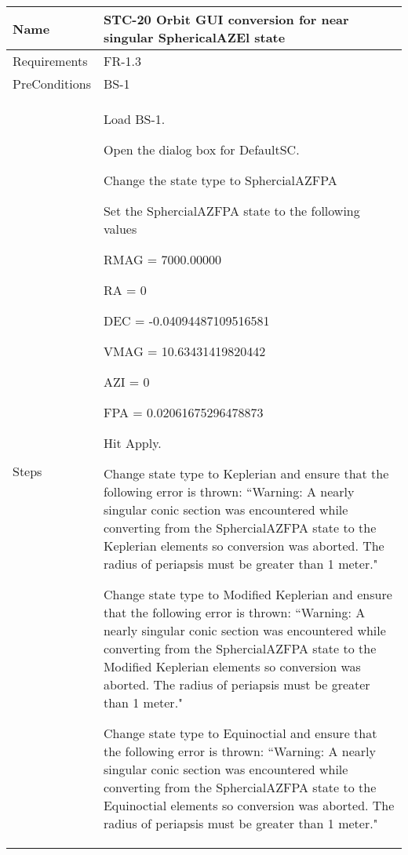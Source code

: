 \begin{table}[htbp!]
\centering
      \begin{tabular}{|p{1.05 in} |p{4.75 in} |}
      \hline
         \rowcolor[rgb]{0.8,0.8,0.8} Name & STC-20 Orbit GUI conversion for near singular SphericalAZEl state \\
         \hline
         Requirements & FR-1.3\\  \hline
         PreConditions & BS-1\\     \hline
        Steps &
         \begin{compactenum}
             \item Load BS-1.
             \item Open the dialog box for DefaultSC.
             \item Change the state type to SphercialAZFPA
             \item Set the SphercialAZFPA state to the following values
                 \begin{compactenum}
                    \item RMAG  = 7000.00000
                    \item RA = 0
                    \item DEC = -0.04094487109516581
                    \item VMAG = 10.63431419820442
                    \item AZI = 0
                    \item FPA = 0.02061675296478873
                    \end{compactenum}
             \item Hit Apply.
             \item Change state type to Keplerian and ensure that the following error is thrown: ``Warning: A nearly singular conic section was encountered while converting from the SphercialAZFPA state to the Keplerian elements so conversion was aborted.  The radius of periapsis must be greater than 1 meter."
             \item Change state type to Modified Keplerian and ensure that the following error is thrown: ``Warning: A nearly singular conic section was encountered while converting from the SphercialAZFPA state to the Modified Keplerian elements so conversion was aborted.  The radius of periapsis must be greater than 1 meter."
             \item Change state type to Equinoctial and ensure that the following error is thrown:  ``Warning: A nearly singular conic section was encountered while converting from the SphercialAZFPA state to the Equinoctial elements so conversion was aborted.  The radius of periapsis must be greater than 1 meter."

\end{compactenum}
\end{tabular}
\end{table}
